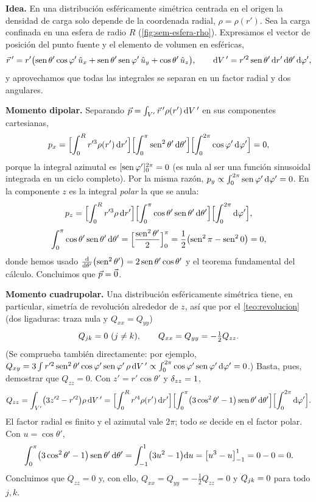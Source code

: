 \begin{resolucion}
\textbf{Idea.} En una distribución esféricamente simétrica centrada en el origen la densidad de carga solo depende de la coordenada radial, $\rho=\rho(r')$. Sea la carga confinada en una
esfera de radio $R$ (\cref{fig:sem-esfera-rho}). Expresamos el vector de posición del punto fuente y el elemento de volumen en esféricas,
\[
  \vec{r}\,'=r'\bigl(\operatorname{sen}\theta'\cos\varphi'\,\hat{u}_{x}+\operatorname{sen}\theta'\operatorname{sen}\varphi'\,\hat{u}_{y}+\cos\theta'\,\hat{u}_{z}\bigr),\qquad \mathrm{d} V\,'=r'^{2}\operatorname{sen}\theta'\,\mathrm{d} r'\,\mathrm{d}\theta'\,\mathrm{d}\varphi',
\]
y aprovechamos que todas las integrales se separan en un factor radial y dos angulares.

\textbf{Momento dipolar.} Separando $\vec{p}=\int_{V'}\vec{r}\,'\rho(r')\,\mathrm{d} V\,'$ en sus componentes cartesianas,
\[
  p_x=\Bigl[\int_{0}^{R}r'^{3}\rho(r')\,\mathrm{d} r'\Bigr]\Bigl[\int_{0}^{\pi}\operatorname{sen}^{2}\theta'\,\mathrm{d}\theta'\Bigr]\Bigl[\int_{0}^{2\pi}\cos\varphi'\,\mathrm{d}\varphi'\Bigr]=0,
\]
porque la integral azimutal es $[\operatorname{sen}\varphi']_{0}^{2\pi}=0$ (es nula al ser una función sinusoidal integrada en un ciclo completo). Por la misma razón,
$p_y\propto\int_{0}^{2\pi}\operatorname{sen}\varphi'\,\mathrm{d}\varphi'=0$. En la componente $z$ es la integral \emph{polar} la que se anula:
\[
  p_z=\Bigl[\int_{0}^{R}r'^{3}\rho\,\mathrm{d} r'\Bigr]\Bigl[\int_{0}^{\pi}\cos\theta'\operatorname{sen}\theta'\,\mathrm{d}\theta'\Bigr]\Bigl[\int_{0}^{2\pi}\mathrm{d}\varphi'\Bigr],
\]
\[
  \int_{0}^{\pi}\cos\theta'\operatorname{sen}\theta'\,\mathrm{d}\theta'=\Bigl[\frac{\operatorname{sen}^{2}\theta'}{2}\Bigr]_{0}^{\pi}=\frac12\bigl(\operatorname{sen}^{2}\pi-\operatorname{sen}^{2}0\bigr)=0,
\]
donde hemos usado $\frac{\mathrm{d}}{\mathrm{d}\theta'}\bigl(\operatorname{sen}^{2}\theta'\bigr)=2\operatorname{sen}\theta'\cos\theta'$ y el teorema fundamental del cálculo. Concluimos que $\vec{p}=\vec{0}$.

\textbf{Momento cuadrupolar.} Una distribución esféricamente simétrica tiene, en particular, simetría de revolución alrededor de $z$, así que por el \cref{teo:revolucion} (dos
ligaduras: traza nula y $Q_{xx}=Q_{yy}$)
\[
  Q_{jk}=0\ (j\neq k),\qquad Q_{xx}=Q_{yy}=-\tfrac12Q_{zz}.
\]
(Se comprueba también directamente: por ejemplo, $Q_{xy}=3\int r'^{2}\operatorname{sen}^{2}\theta'\cos\varphi'\operatorname{sen}\varphi'\,\rho\,\mathrm{d} V\,'\propto\int_0^{2\pi}\cos\varphi'\operatorname{sen}\varphi'\,\mathrm{d}\varphi'=0$.) Basta,
pues, demostrar que $Q_{zz}=0$. Con $z'=r'\cos\theta'$ y $\delta_{zz}=1$,
\[
  Q_{zz}=\int_{V'}\bigl(3z'^{2}-r'^{2}\bigr)\rho\,\mathrm{d} V\,'=\Bigl[\int_{0}^{R}r'^{4}\rho(r')\,\mathrm{d} r'\Bigr]\Bigl[\int_{0}^{\pi}\bigl(3\cos^{2}\theta'-1\bigr)\operatorname{sen}\theta'\,\mathrm{d}\theta'\Bigr]\Bigl[\int_{0}^{2\pi}\mathrm{d}\varphi'\Bigr].
\]
El factor radial es finito y el azimutal vale $2\pi$; todo se decide en el factor polar. Con $u=\cos\theta'$,
\[
  \int_{0}^{\pi}\bigl(3\cos^{2}\theta'-1\bigr)\operatorname{sen}\theta'\,\mathrm{d}\theta'=\int_{-1}^{1}\bigl(3u^{2}-1\bigr)\mathrm{d} u=\bigl[u^{3}-u\bigr]_{-1}^{1}=0-0=0 .
\]
Concluimos que $Q_{zz}=0$ y, con ello, $Q_{xx}=Q_{yy}=-\frac12Q_{zz}=0$ y $Q_{jk}=0$ para todo $j,k$.
\end{resolucion}

